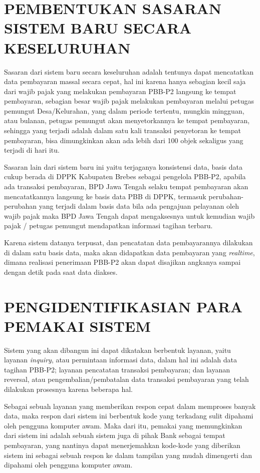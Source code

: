 \documentclass[pdftex, 12pt, oneside]{article}
\begin{document}
\section{PEMBENTUKAN SASARAN SISTEM BARU SECARA KESELURUHAN}

Sasaran dari sistem baru secara keseluruhan adalah tentunya dapat mencatatkan data pembayaran massal secara cepat, hal ini karena hanya sebagian kecil saja dari wajib pajak yang melakukan pembayaran PBB-P2 langsung ke tempat pembayaran, sebagian besar wajib pajak melakukan pembayaran melalui petugas pemungut Desa/Kelurahan, yang dalam periode tertentu, mungkin mingguan, atau bulanan, petugas pemungut akan menyetorkannya ke tempat pembayaran, sehingga yang terjadi adalah dalam satu kali transaksi penyetoran ke tempat pembayaran, bisa dimungkinkan akan ada lebih dari 100 objek sekaligus yang terjadi di hari itu.

Sasaran lain dari sistem baru ini yaitu terjaganya konsistensi data, basis data cukup berada di DPPK Kabupaten Brebes sebagai pengelola PBB-P2, apabila ada transaksi pembayaran, BPD Jawa Tengah selaku tempat pembayaran akan mencatatkannya langsung ke basis data PBB di DPPK, termasuk perubahan-perubahan yang terjadi dalam basis data bila ada pengajuan pelayanan oleh wajib pajak maka BPD Jawa Tengah dapat mengaksesnya untuk kemudian wajib pajak / petugas pemungut mendapatkan informasi tagihan terbaru.

Karena sistem datanya terpusat, dan pencatatan data pembayarannya dilakukan di dalam satu basis data, maka akan didapatkan data pembayaran yang \textit{realtime}, dimana realisasi penerimaan PBB-P2 akan dapat disajikan angkanya sampai dengan detik pada saat data diakses.


\section{PENGIDENTIFIKASIAN PARA PEMAKAI SISTEM}

Sistem yang akan dibangun ini dapat dikatakan berbentuk layanan, yaitu layanan \textit{inquiry}, atau permintaan informasi data, dalam hal ini adalah data tagihan PBB-P2; layanan pencatatan transaksi pembayaran; dan layanan reversal, atau pengembalian/pembatalan data transaksi pembayaran yang telah dilakukan prosesnya karena beberapa hal.

Sebagai sebuah layanan yang memberikan respon cepat dalam memproses banyak data, maka respon dari sistem ini berbentuk kode yang terkadang sulit dipahami oleh pengguna komputer awam. Maka dari itu, pemakai yang memungkinkan dari sistem ini adalah sebuah sistem juga di pihak Bank sebagai tempat pembayaran, yang nantinya dapat menerjemahkan kode-kode yang diberikan sistem ini sebagai sebuah respon ke dalam tampilan yang mudah dimengerti dan dipahami oleh pengguna komputer awam.
\end{document}
